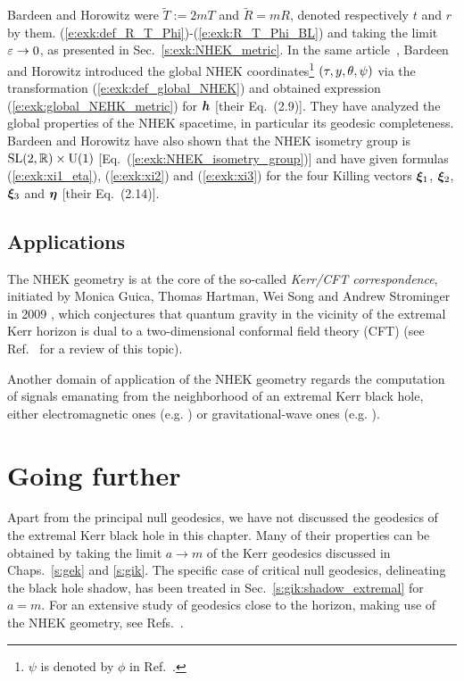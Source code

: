 \begin{hist}
{Bardeen and Horowitz were $\tilde{T} := 2m T$ and $\tilde{R} = m R$, denoted
respectively $t$ and $r$ by them.}  (\ref{e:exk:def_R_T_Phi})-(\ref{e:exk:R_T_Phi_BL}) and taking the limit $\varepsilon\to 0$, as presented in
Sec.~\ref{s:exk:NHEK_metric}. In the same article~\cite{BardeH99},
Bardeen and Horowitz introduced
the global NHEK coordinates\footnote{$\psi$ is denoted by $\phi$ in Ref.~\cite{BardeH99}.}
$(\tau,y,\theta,\psi)$ via the transformation (\ref{e:exk:def_global_NHEK})
and obtained expression (\ref{e:exk:global_NEHK_metric}) for $\bm{h}$ [their Eq.~(2.9)]. They have
analyzed the global properties of the NHEK spacetime, in particular its geodesic completeness.
Bardeen and Horowitz have also shown that the NHEK isometry group is
$\mathrm{SL}(2,\mathbb{R})\times \mathrm{U}(1)$ [Eq.~(\ref{e:exk:NHEK_isometry_group})]
and have given formulas (\ref{e:exk:xi1_eta}), (\ref{e:exk:xi2}) and (\ref{e:exk:xi3})
for the four Killing vectors $\bm{\xi}_1$, $\bm{\xi}_2$, $\bm{\xi}_3$ and $\bm{\eta}$
[their Eq.~(2.14)].
\end{hist}

\subsection{Applications}

The NHEK geometry is at the core of the so-called \emph{Kerr/CFT correspondence}, initiated by Monica Guica, Thomas Hartman, Wei Song and Andrew Strominger in 2009 \cite{GuicaHSS09}, which conjectures that quantum gravity
in the vicinity of the extremal Kerr horizon is dual to a two-dimensional
conformal field theory (CFT)
(see Ref.~\cite{Compe17} for a review of this topic).

Another domain of application of the NHEK geometry regards the computation
of signals emanating from the neighborhood
of an extremal Kerr black hole, either
electromagnetic ones (e.g. \cite{GrallLS18,CompeD20,KapecL20})
or gravitational-wave ones (e.g. \cite{CompeFHL18,GrallPW15}).

\section{Going further}

Apart from the principal null geodesics, we have not discussed the geodesics
of the extremal Kerr black hole in this chapter. Many of their properties
can be obtained by taking the limit $a\to m$ of the Kerr geodesics discussed
in Chaps.~\ref{s:gek} and \ref{s:gik}. The specific case of critical null
geodesics, delineating the black hole shadow, has been treated in Sec.~\ref{s:gik:shadow_extremal}
for $a=m$.
For an extensive study of geodesics close to the horizon, making use of the NHEK geometry,
see Refs.~\cite{KapecL20,CompeD20}.


